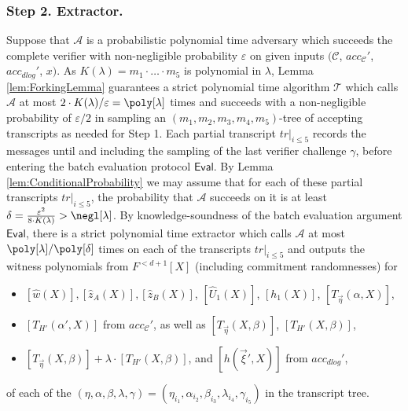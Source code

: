 \documentclass[10pt,article,oneside]{memoir}
\theoremstyle{definition}
\theoremstyle{remark}
\begin{document}
\subsubsection{Step 2. Extractor.}
Suppose that $\mathcal A$ is a probabilistic polynomial time adversary which succeeds the complete verifier with non-negligible probability $\varepsilon$ on given inputs $(\mathcal C$, $acc_\mathcal C'$, $acc_{dlog}'$, $x)$. 
As $K(\lambda)=m_1\cdot\ldots\cdot m_5$ is polynomial in $\lambda$, Lemma \ref{lem:ForkingLemma} guarantees a strict polynomial time algorithm $\mathcal T$ which calls $\mathcal A$ at most $2\cdot K(\lambda)/\varepsilon = \poly[\lambda]$ times and succeeds with a non-negligible probability of $\varepsilon/2$ in sampling an $(m_1,m_2,m_3,m_4,m_5)$-tree of accepting transcripts as needed for Step 1.
Each partial transcript $tr|_{i\leq 5}$ records the messages until and including the sampling of the last verifier challenge $\gamma$, before entering the batch evaluation protocol $\mathsf{Eval}$. 
By Lemma \ref{lem:ConditionalProbability} we may assume that for each of these partial transcripts $tr|_{i\leq 5}$, the probability that $\mathcal A$ succeeds on it is at least $\delta= \frac{\varepsilon^2}{8\cdot K(\lambda)} > \negl[\lambda]$.
By knowledge-soundness of the batch evaluation argument $\mathsf{Eval}$, there is a strict polynomial time extractor which calls $\mathcal A$ at most $\poly[\lambda]/\poly[\delta]$ times on each of the transcripts $tr|_{i\leq 5}$ %
 and outputs the witness polynomials from $F^{<d+1}[X]$ (including commitment randomnesses) for 
\begin{itemize}
\item
$[\hat w(X)], [\hat z_A(X)], [\hat z_B(X)]$,
$[\hat U_1(X)]$, $[h_1(X)]$, $[T_{\vec\eta}(\alpha, X)]$,
\item
$[T_{H'}(\alpha',X)]$ from $acc_\mathcal C'$, as well as $[T_{\vec\eta}(X,\beta)]$, $[T_{H'}(X,\beta)]$, 
\item
$[T_{\vec\eta}(X,\beta)]+\lambda\cdot [T_{H'}(X,\beta)]$, and 
$[h(\vec\xi',X)]$ from $acc_{dlog}'$,
\end{itemize}
of each of the $(\eta,\alpha,\beta,\lambda,\gamma)= (\eta_{i_1},\alpha_{i_2},\beta_{i_3},\lambda_{i_4},\gamma_{i_5})$ in the transcript tree.
\end{document}
